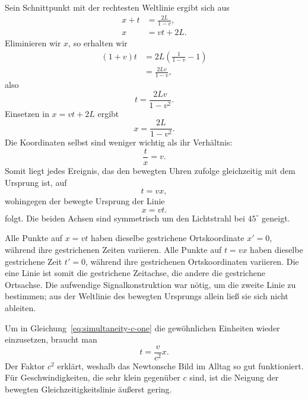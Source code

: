 Sein Schnittpunkt mit der rechtesten Weltlinie ergibt sich aus
\begin{align}
x+t&=\frac{2L}{1-v},\\
x&=vt+2L.
\end{align}
Eliminieren wir \(x\), so erhalten wir
\begin{align}
(1+v)t
  &=2L\left(\frac{1}{1-v}-1\right)\\
  &=\frac{2Lv}{1-v},
\end{align}
also
\begin{equation}
t=\frac{2Lv}{1-v^2}.
\end{equation}
Einsetzen in \(x=vt+2L\) ergibt
\begin{equation}
x=\frac{2L}{1-v^2}.
\end{equation}
Die Koordinaten selbst sind weniger wichtig als ihr Verhältnis:
\begin{equation}
\frac{t}{x}=v.
\end{equation}
Somit liegt jedes Ereignis, das den bewegten Uhren zufolge gleichzeitig mit dem Ursprung ist, auf
\begin{equation}
t=vx,
\label{eq:simultaneity-c-one}
\end{equation}
wohingegen der bewegte Ursprung der Linie
\begin{equation}
x=vt.
\label{eq:moving-time-axis}
\end{equation}
folgt. Die beiden Achsen sind symmetrisch um den Lichtstrahl bei \(45^\circ\) geneigt.

Alle Punkte auf \(x=vt\) haben dieselbe gestrichene Ortskoordinate \(x'=0\), während ihre gestrichenen Zeiten variieren. Alle Punkte auf \(t=vx\) haben dieselbe gestrichene Zeit \(t'=0\), während ihre gestrichenen Ortskoordinaten variieren. Die eine Linie ist somit die gestrichene Zeitachse, die andere die gestrichene Ortsachse. Die aufwendige Signalkonstruktion war nötig, um die zweite Linie zu bestimmen; aus der Weltlinie des bewegten Ursprungs allein ließ sie sich nicht ableiten.

Um in Gleichung~\eqref{eq:simultaneity-c-one} die gewöhnlichen Einheiten wieder einzusetzen, braucht man
\begin{equation}
t=\frac{v}{c^2}x.
\label{eq:simultaneity-dimensional}
\end{equation}
Der Faktor \(c^2\) erklärt, weshalb das Newtonsche Bild im Alltag so gut funktioniert. Für Geschwindigkeiten, die sehr klein gegenüber \(c\) sind, ist die Neigung der bewegten Gleichzeitigkeitslinie äußerst gering.

